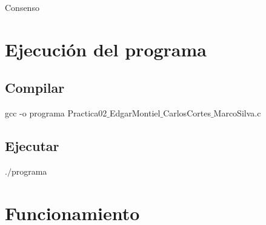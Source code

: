\documentclass[a4paper,12pt]{article}
\begin{document}

\newpage

\newpage

\begin{center}
    {\huge Consenso}
\end{center}

\section*{Ejecución del programa}

\subsection*{Compilar}
\begin{center}
    gcc -o programa Practica02$\_$EdgarMontiel$\_$CarlosCortes$\_$MarcoSilva.c
\end{center}

\subsection*{Ejecutar}
\begin{center}
    $.\slash$programa
\end{center}

\section*{Funcionamiento}
\end{document}
